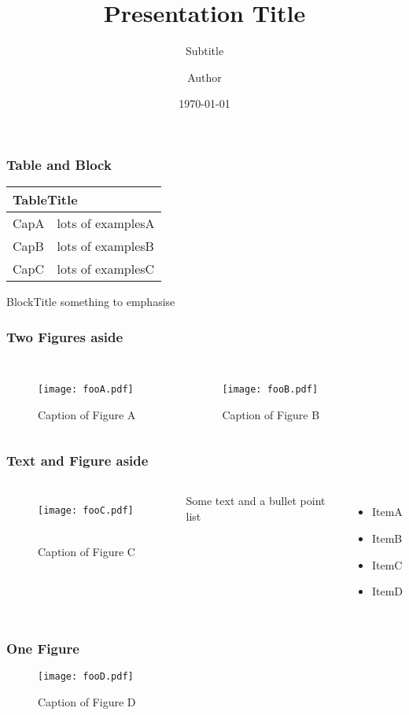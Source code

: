 \documentclass[handout]{beamer}
\institute{\texttt{[image: Imperial\_1\_Pantone\_solid.eps]}}
\title{Presentation Title}
\subtitle{Subtitle}
\author{Author}
\date{\today}
\begin{document}
 
\frame{\titlepage}


\begin{frame}
	\frametitle{Table and Block}
	\begin{table}[h]
		\centering
		\begin{tabular}{p{} p{}} 
			\toprule
			\multicolumn{2}{p{0.9\textwidth}}{TableTitle} \\
			\midrule
			CapA       & lots of examplesA \\

			CapB       & lots of examplesB \\
			
			CapC       & lots of examplesC \\
			\bottomrule
		\end{tabular} 
	\end{table}

	\begin{block}{BlockTitle}
		something to emphasise
	\end{block}
\end{frame}


\begin{frame}
	\frametitle{Two Figures aside}
	\begin{columns}[b]
			\centering
			\begin{figure}
				\texttt{[image: fooA.pdf]} \
				\caption{Caption of Figure A}
			\end{figure}
			\centering
			\begin{figure}
				\texttt{[image: fooB.pdf]} \
				\caption{Caption of Figure B}
			\end{figure}
	\end{columns}
\end{frame}


\begin{frame}
	\frametitle{Text and Figure aside}
	\begin{columns}[]
			\centering
			\begin{figure}
				\texttt{[image: fooC.pdf]} \
				\caption{Caption of Figure C}
			\end{figure}
		\column{0.4875\textwidth}
			Some text and a bullet point list
			\begin{itemize}
				\item ItemA
				\item ItemB
				\item ItemC
				\item ItemD
			\end{itemize}			
	\end{columns}
\end{frame}


\begin{frame}
	\frametitle{One Figure}
	\bigskip
	\begin{figure}
		\texttt{[image: fooD.pdf]}
		\caption{Caption of Figure D}
	\end{figure}
\end{frame}

 
\end{document}
